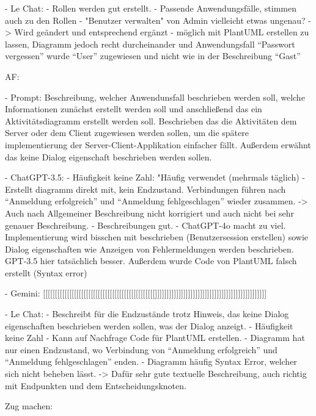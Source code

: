 - Le Chat:
    - Rollen werden gut erstellt.
    - Passende Anwendungsfälle, stimmen auch zu den Rollen
    - "Benutzer verwalten" von Admin vielleicht etwas ungenau? -> Wird geändert und entsprechend ergänzt
    - möglich mit PlantUML erstellen zu lassen, Diagramm jedoch recht durcheinander und Anwendungsfall ``Passwort vergessen'' wurde ``User'' 
    zugewiesen und nicht wie in der Beschreibung ``Gast''


AF:

- Prompt: Beschreibung, welcher Anwendunsfall beschrieben werden soll, welche Informationen zunächst erstellt werden soll und anschließend das ein 
Aktivitätsdiagramm erstellt werden soll. Beschrieben das die Aktivitäten dem Server oder dem Client zugewiesen werden sollen, um die spätere 
implementierung der Server-Client-Applikation einfacher fällt. Außerdem erwähnt das keine Dialog eigenschaft beschrieben werden sollen.

- ChatGPT-3.5:
    - Häufigkeit keine Zahl: "Häufig verwendet (mehrmals täglich)
    - Erstellt diagramm direkt mit, kein Endzustand. Verbindungen führen nach ``Anmeldung erfolgreich'' und ``Anmeldung fehlgeschlagen'' wieder zusammen.
    -> Auch nach Allgemeiner Beschreibung nicht korrigiert und auch nicht bei sehr genauer Beschreibung.
    - Beschreibungen gut.
    - ChatGPT-4o macht zu viel. Implementierung wird bisschen mit beschrieben (Benutzersession erstellen) sowie Dialog 
    eigenschaften wie Anzeigen von Fehlermeldungen werden beschrieben. GPT-3.5 hier tatsächlich besser. Außerdem wurde Code
    von PlantUML falsch erstellt (Syntax error)


- Gemini: [[[[[[[[[[[[[[[[[[[[[[[[[[[[[[[[[[[[[[[[[[[[[[[]]]]]]]]]]]]]]]]]]]]]]]]]]]]]]]]]]]]]]]]]]]]]]]

- Le Chat:
    - Beschreibt für die Endzustände trotz Hinweis, das keine Dialog eigenschaften beschrieben werden sollen, was der Dialog anzeigt.
    - Häufigkeit keine Zahl
    - Kann auf Nachfrage Code für PlantUML erstellen.
    - Diagramm hat nur einen Endzustand, wo Verbindung von ``Anmeldung erfolgreich'' und ``Anmeldung fehlgeschlagen'' enden.
    - Diagramm häufig Syntax Error, welcher sich nicht beheben lässt. -> Dafür sehr gute textuelle Beschreibung, auch richtig mit 
    Endpunkten und dem Entscheidungsknoten.


    Zug machen:

